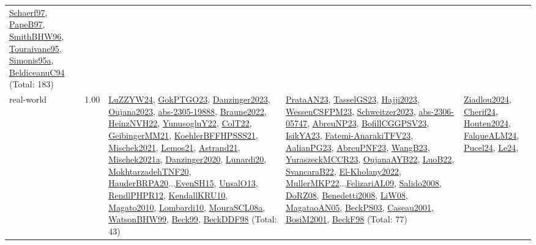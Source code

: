 {\begin{longtable}{p{3cm}r>{\raggedright\arraybackslash}p{6cm}>{\raggedright\arraybackslash}p{6cm}>{\raggedright\arraybackslash}p{8cm}}
\hyperref[detail:Schaerf97]{Schaerf97}, \hyperref[detail:PapeB97]{PapeB97}, \hyperref[detail:SmithBHW96]{SmithBHW96}, \hyperref[detail:Touraivane95]{Touraivane95}, \hyperref[detail:Simonis95a]{Simonis95a}, \hyperref[detail:BeldiceanuC94]{BeldiceanuC94} (Total: 183)\\
\index{real-world}\index{Benchmarks!real-world}real-world &  1.00 & \hyperref[detail:LuZZYW24]{LuZZYW24}, \hyperref[detail:GokPTGO23]{GokPTGO23}, \hyperref[detail:Danzinger2023]{Danzinger2023}, \hyperref[detail:Oujana2023]{Oujana2023}, \hyperref[detail:abs-2305-19888]{abs-2305-19888}, \hyperref[detail:Braune2022]{Braune2022}, \hyperref[detail:HeinzNVH22]{HeinzNVH22}, \hyperref[detail:YunusogluY22]{YunusogluY22}, \hyperref[detail:ColT22]{ColT22}, \hyperref[detail:GeibingerMM21]{GeibingerMM21}, \hyperref[detail:KoehlerBFFHPSSS21]{KoehlerBFFHPSSS21}, \hyperref[detail:Mischek2021]{Mischek2021}, \hyperref[detail:Lemos21]{Lemos21}, \hyperref[detail:Astrand21]{Astrand21}, \hyperref[detail:Mischek2021a]{Mischek2021a}, \hyperref[detail:Danzinger2020]{Danzinger2020}, \hyperref[detail:Lunardi20]{Lunardi20}, \hyperref[detail:MokhtarzadehTNF20]{MokhtarzadehTNF20}, \hyperref[detail:HauderBRPA20]{HauderBRPA20}...\hyperref[detail:EvenSH15]{EvenSH15}, \hyperref[detail:UnsalO13]{UnsalO13}, \hyperref[detail:RendlPHPR12]{RendlPHPR12}, \hyperref[detail:KendallKRU10]{KendallKRU10}, \hyperref[detail:Magato2010]{Magato2010}, \hyperref[detail:Lombardi10]{Lombardi10}, \hyperref[detail:MouraSCL08a]{MouraSCL08a}, \hyperref[detail:WatsonBHW99]{WatsonBHW99}, \hyperref[detail:Beck99]{Beck99}, \hyperref[detail:BeckDDF98]{BeckDDF98} (Total: 43) & \hyperref[detail:PrataAN23]{PrataAN23}, \hyperref[detail:TasselGS23]{TasselGS23}, \hyperref[detail:Hajji2023]{Hajji2023}, \hyperref[detail:WessenCSFPM23]{WessenCSFPM23}, \hyperref[detail:Schweitzer2023]{Schweitzer2023}, \hyperref[detail:abs-2306-05747]{abs-2306-05747}, \hyperref[detail:AbreuNP23]{AbreuNP23}, \hyperref[detail:BofillCGGPSV23]{BofillCGGPSV23}, \hyperref[detail:IsikYA23]{IsikYA23}, \hyperref[detail:Fatemi-AnarakiTFV23]{Fatemi-AnarakiTFV23}, \hyperref[detail:AalianPG23]{AalianPG23}, \hyperref[detail:AbreuPNF23]{AbreuPNF23}, \hyperref[detail:WangB23]{WangB23}, \hyperref[detail:YuraszeckMCCR23]{YuraszeckMCCR23}, \hyperref[detail:OujanaAYB22]{OujanaAYB22}, \hyperref[detail:LuoB22]{LuoB22}, \hyperref[detail:SvancaraB22]{SvancaraB22}, \hyperref[detail:El-Kholany2022]{El-Kholany2022}, \hyperref[detail:MullerMKP22]{MullerMKP22}...\hyperref[detail:FelizariAL09]{FelizariAL09}, \hyperref[detail:Salido2008]{Salido2008}, \hyperref[detail:DoRZ08]{DoRZ08}, \hyperref[detail:Benedetti2008]{Benedetti2008}, \hyperref[detail:LiW08]{LiW08}, \hyperref[detail:MagataoAN05]{MagataoAN05}, \hyperref[detail:BeckPS03]{BeckPS03}, \hyperref[detail:Caseau2001]{Caseau2001}, \hyperref[detail:BosiM2001]{BosiM2001}, \hyperref[detail:BeckF98]{BeckF98} (Total: 77) & \hyperref[detail:Ziadlou2024]{Ziadlou2024}, \hyperref[detail:Cherif24]{Cherif24}, \hyperref[detail:Houten2024]{Houten2024}, \hyperref[detail:FalqueALM24]{FalqueALM24}, \hyperref[detail:Pucel24]{Pucel24}, \hyperref[detail:Le24]{Le24}, 
\end{longtable}}
